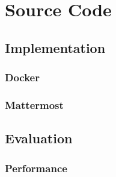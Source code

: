 %
\begin{appendices}
\label{ch:appendix}

\chapter{Source Code}
\label{ch:appendix:source}

\section{Implementation}

\subsection{Docker}





\subsection{Mattermost}




\section{Evaluation}

\subsection{Performance}




\end{appendices}

